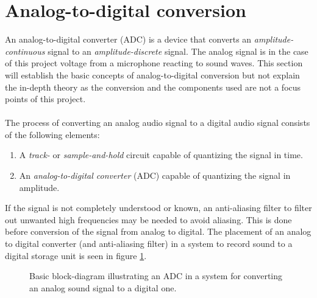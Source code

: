 \section{Analog-to-digital conversion} \label{ADC}
An analog-to-digital converter (ADC) is a device that converts an \textit{amplitude-continuous} signal to an \textit{amplitude-discrete} signal.  The analog signal is in the case of this project voltage from a microphone reacting to sound waves. This section will establish the basic concepts of analog-to-digital conversion but not explain the in-depth theory as the conversion and the components used are not a focus points of this project.
\\ \\
The process of converting an analog audio signal to a digital audio signal consists of the following elements:
\begin{enumerate}
\item A \textit{track-} or \textit{sample-and-hold} circuit capable of quantizing the signal in time.
\item An \textit{analog-to-digital converter} (ADC) capable of quantizing the signal in amplitude.
\end{enumerate}
If the signal is not completely understood or known, an anti-aliasing filter to filter out unwanted high frequencies may be needed to avoid aliasing. This is done before conversion of the signal from analog to digital. The placement of an analog to digital converter (and anti-aliasing filter) in a system to record sound to a digital storage unit is seen in figure \ref{fig:input}.
\begin{figure}[H]
\centering
{}
\caption{Basic block-diagram illustrating an ADC in a system for converting an analog sound signal to a digital one.} 
\label{fig:input}
\end{figure}
%

